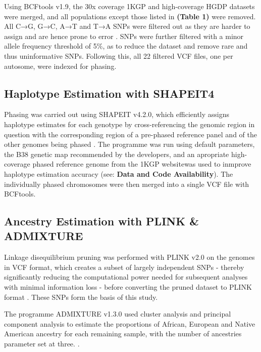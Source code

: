 \documentclass[11pt]{article}
\begin{document}
Using BCFtools v1.9, the 30x coverage 1KGP and high-coverage HGDP datasets were merged, and all populations except those listed in \textbf{(Table 1)} were removed. All C→G, G→C, A→T and T→A SNPs were filtered out as they are harder to assign and are hence prone to error \parencite{Danecek2021}. SNPs were further filtered with a minor allele frequency threshold of 5\%, as to reduce the dataset and remove rare and thus uninformative SNPs. Following this, all 22 filtered VCF files, one per autosome, were indexed for phasing. 








\subsection{Haplotype Estimation with SHAPEIT4}


Phasing was carried out using SHAPEIT v4.2.0, which efficiently assigns haplotype estimates for each genotype by cross-referencing the genomic region in question with the corresponding region of a pre-phased reference panel and of the other genomes being phased \parencite{Delaneau2019}. The programme was run using default parameters, the B38 genetic map recommended by the developers, and an apropriate high-coverage phased reference genome from the 1KGP websitewas used to inmprove haplotype estimation accuracy (see: \textbf{Data and Code Availability}). The individually phased chromosomes were then merged into a single VCF file with BCFtools. 





\subsection{Ancestry Estimation with PLINK \& ADMIXTURE}


Linkage disequilibrium pruning was performed with PLINK v2.0 on the genomes in VCF format, which creates a subset of largely independent SNPs - thereby significantly reducing the computational power needed for subsequent analyses with minimal information loss - before converting the pruned dataset to PLINK format \parencite{Purcell2007}. These SNPs form the basis of this study.

The programme ADMIXTURE v1.3.0 used cluster analysis and principal component analysis to estimate the proportions of African, European and Native American ancestry for each remaining sample, with the number of ancestries parameter set at three. \parencite{Alexander2009}.
\end{document}
